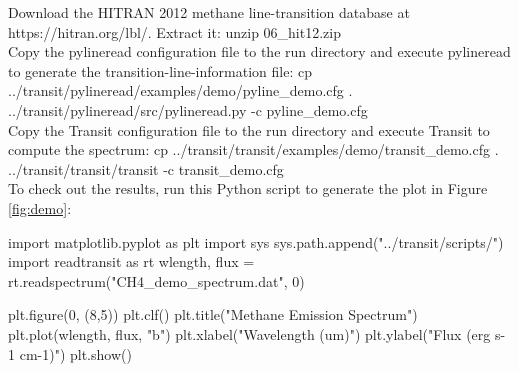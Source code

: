 \documentclass[letterpaper, 12pt]{article}
\begin{document}
\noindent Download the HITRAN 2012 methane line-transition database at https://hitran.org/lbl/. Extract it: \newline
{\tttb unzip 06\_hit12.zip} \\

\noindent Copy the {\tttm pylineread} configuration file to the run directory and execute pylineread to generate the transition-line-information file: \newline
{\tttb cp ../transit/pylineread/examples/demo/pyline\_demo.cfg .} \\
{\tttb ../transit/pylineread/src/pylineread.py -c pyline\_demo.cfg} \\

\noindent Copy the Transit configuration file to the run
directory and execute Transit to compute the spectrum: \newline
{\tttb cp ../transit/transit/examples/demo/transit\_demo.cfg .} \\
{\tttb ../transit/transit/transit -c transit\_demo.cfg} \\

\noindent To check out the results, run this Python script to generate
the plot in Figure \ref{fig:demo}: \newline
\begin{python}
import matplotlib.pyplot as plt
import sys
sys.path.append("../transit/scripts/")
import readtransit as rt
wlength, flux = rt.readspectrum("CH4_demo_spectrum.dat", 0)

plt.figure(0, (8,5))
plt.clf()
plt.title("Methane Emission Spectrum")
plt.plot(wlength, flux, "b")
plt.xlabel("Wavelength  (um)")
plt.ylabel("Flux  (erg s-1 cm-1)")
plt.show()
\end{python}
\end{document}
